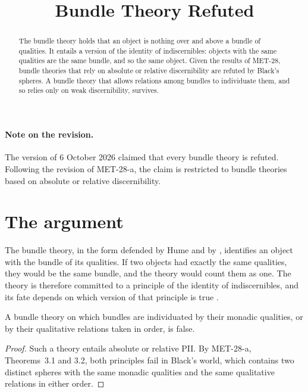 \documentclass{situationist-preprint}
\title{Bundle Theory Refuted}
\begin{document}
\maketitle

\begin{abstract}
The bundle theory holds that an object is nothing over and above a bundle of qualities. It entails a version of the identity of indiscernibles: objects with the same qualities are the same bundle, and so the same object. Given the results of MET-28, bundle theories that rely on absolute or relative discernibility are refuted by Black's spheres. A bundle theory that allows relations among bundles to individuate them, and so relies only on weak discernibility, survives.
\end{abstract}

\paragraph{Note on the revision.} The version of 6 October 2026 claimed that every bundle theory is refuted. Following the revision of MET-28-a, the claim is restricted to bundle theories based on absolute or relative discernibility.

\section{The argument}

The bundle theory, in the form defended by Hume and by \citet{Russell1948}, identifies an object with the bundle of its qualities. If two objects had exactly the same qualities, they would be the same bundle, and the theory would count them as one. The theory is therefore committed to a principle of the identity of indiscernibles, and its fate depends on which version of that principle is true \citep{OLearyHawthorne1995}.

\begin{proposition}\label{p:main}
A bundle theory on which bundles are individuated by their monadic qualities, or by their qualitative relations taken in order, is false.
\end{proposition}

\begin{proof}
Such a theory entails absolute or relative PII. By MET-28-a, Theorems~3.1 and 3.2, both principles fail in Black's world, which contains two distinct spheres with the same monadic qualities and the same qualitative relations in either order.
\end{proof}
\end{document}
